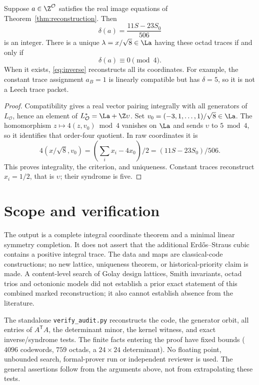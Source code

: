 \begin{theorem}\label{thm:syndrome}
Suppose $a\in\Z^{\mathcal O}$ satisfies the real image equations of Theorem~\ref{thm:reconstruction}. Then
\[
\delta(a)=\frac{11S-23S_0}{506}
\]
is an integer. There is a unique $\lambda=x/\sqrt8\in\La$ having these octad traces if and only if
\begin{equation}\label{eq:syndrome}
\boxed{\delta(a)\equiv0\pmod4.}
\end{equation}
When it exists, \eqref{eq:inverse} reconstructs all its coordinates. For example, the constant trace assignment $a_B=1$ is linearly compatible but has $\delta=5$, so it is not a Leech trace packet.
\end{theorem}
\begin{proof}
Compatibility gives a real vector pairing integrally with all generators of $L_{\mathcal O}$, hence an element of $L_{\mathcal O}^*=\La+\Z\upsilon$. Set $v_0=(-3,1,\ldots,1)/\sqrt8\in\La$. The homomorphism $z\mapsto4(z,v_0)\bmod4$ vanishes on $\La$ and sends $\upsilon$ to $5\bmod4$, so it identifies that order-four quotient. In raw coordinates it is
\[
4(x/\sqrt8,v_0)=(\sum_i x_i-4x_0)/2
=(11S-23S_0)/506.
\]
This proves integrality, the criterion, and uniqueness. Constant traces reconstruct $x_i=1/2$, that is $\upsilon$; their syndrome is five.
\end{proof}

\section{Scope and verification}
The output is a complete integral coordinate theorem and a minimal linear symmetry completion. It does not assert that the additional Erd\H{o}s--Straus cubic contains a positive integral trace. The data and maps are classical-code constructions; no new lattice, uniqueness theorem, or historical-priority claim is made. A content-level search of Golay design lattices, Smith invariants, octad trios and octonionic models did not establish a prior exact statement of this combined marked reconstruction; it also cannot establish absence from the literature.

The standalone \texttt{verify\_audit.py} reconstructs the code, the generator orbit, all entries of $A^{\mathsf T}A$, the determinant minor, the kernel witness, and exact inverse/syndrome tests. The finite facts entering the proof have fixed bounds ($4096$ codewords, $759$ octads, a $24\times24$ determinant). No floating point, unbounded search, formal-prover run or independent reviewer is used. The general assertions follow from the arguments above, not from extrapolating these tests.
